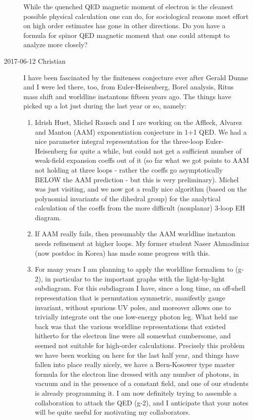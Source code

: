 \begin{description}
While the quenched QED magnetic moment of electron is the cleanest
possible physical calculation one can do, for sociological reasons most
effort on high order estimates has gone in other directions. Do you have
a formula for spinor QED magnetic moment that one could attempt to
analyze more closely?


\item[2017-06-12 Christian]
I have been
fascinated by the finiteness conjecture ever after Gerald Dunne and I
were led there, too, from Euler-Heisenberg, Borel analysis,
Ritus mass shift and worldline instantons fifteen years ago.
The things have picked up a lot
just during the last year or so, namely:

\begin{enumerate}
  \item
Idrish Huet, Michel Rausch and I are working on the Affleck,
Alvarez and Manton (AAM) exponentiation conjecture in 1+1 QED.
We had a nice parameter integral representation for the three-loop
Euler-Heisenberg for quite a while, but could not get a sufficient number
of weak-field expansion coeffs out of it (so far what we got points to
AAM not holding at three loops - rather the coeffs go asymptotically
BELOW the AAM prediction - but this is very preliminary). Michel was just
visiting, and we now got a really nice algorithm (based on the polynomial
invariants of the dihedral group) for the analytical calculation of the
coeffs from the more difficult (nonplanar) 3-loop EH diagram.
  \item
If AAM really fails, then presumably the AAM worldline instanton needs
refinement at higher loops. My former student Naser Ahmadiniaz (now
postdoc in Korea) has made some progress with this.
  \item
For many years I am planning to apply the worldline formalism to (g-2),
in particular to the important graphs with the
light-by-light subdiagram. For this subdiagram I have, since a long time,
an off-shell representation that is permutation symmetric, manifestly
gauge invariant, without spurious UV poles, and moreover allows one to
trivially integrate out the one low-energy photon leg. What held me back
was that the various worldline representations that existed hitherto for
the electron line were all somewhat cumbersome, and seemed not suitable
for high-order calculations. Precisely this problem we have been working
on here for the last half year, and things have fallen into place really
nicely, we have a Bern-Kosower type master formula for the electron line
dressed with any number of photons, in vacuum and in the presence of a
constant field, and one of our students is already programming it. I am
now definitely trying to assemble a collaboration to attack the QED (g-2),
and I anticipate that your notes will be quite useful for motivating my
collaborators.


\end{enumerate}
\end{description}

